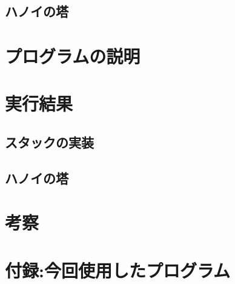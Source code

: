 \documentclass[a4paper,11pt]{jsarticle}
\begin{document}
\subsection{ハノイの塔}
\section{プログラムの説明}
\section{実行結果}
\subsection{スタックの実装}
\subsection{ハノイの塔}
\section{考察}
\section{付録:今回使用したプログラム}

\end{document}
